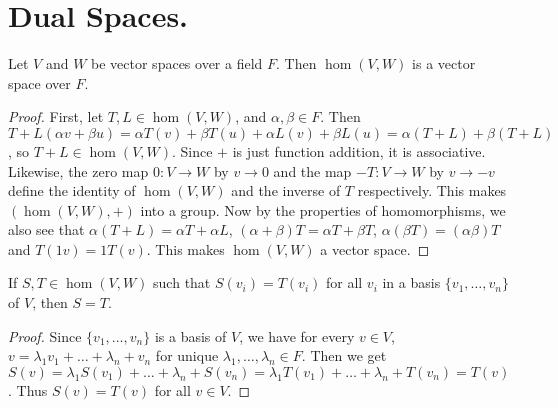 
\section{Dual Spaces.}
\label{section1}

\begin{lemma}\label{1.3.1}
    Let $V$ and  $W$ be vector spaces over a field  $F$. Then  $\hom(V,W)$ is a
    vector space over $F$.
\end{lemma}
\begin{proof}
    First, let $T,L \in \hom(V,W)$, and $\alpha, \beta \in F$. Then  $T+L(\alpha
    v+ \beta u)=\alpha T(v)+\beta T(u)+\alpha L(v)+\beta
    L(u)=\alpha(T+L)+\beta(T+L)$, so $T+L \in \hom(V,W)$. Since $+$ is just
    function addition, it is associative. Likewise, the zero map  $0:V
    \rightarrow W$ by $v \rightarrow 0$ and the map $-T:V \rightarrow W$ by $v
    \rightarrow -v$ define the identity of $\hom(V,W)$ and the inverse of $T$
    respectively. This makes  $(\hom(V,W),+)$ into a group. Now by the
    properties of homomorphisms, we also see that $\alpha(T+L)=\alpha T+\alpha
    L$, $(\alpha+\beta)T=\alpha T+\beta T$, $\alpha(\beta T)=(\alpha\beta)T$ and
    $T(1v)=1T(v)$. This makes $\hom(V,W)$ a vector space.
\end{proof}

\begin{lemma}\label{1.3.2}
    If $S,T \in \hom(V,W)$ such that $S(v_i)=T(v_i)$ for all $v_i$ in a basis
    $\{v_1, \dots, v_n\}$ of $V$, then  $S=T$.
\end{lemma}
\begin{proof}
    Since $\{v_1, \dots, v_n\}$ is a basis of $V$, we have for every  $v \in V$,
     $v=\lambda_1v_1+\dots+\lambda_n+v_n$ for unique $\lambda_1, \dots,
     \lambda_n \in F$. Then we get
     $S(v)=\lambda_1S(v_1)+\dots+\lambda_n+S(v_n)=\lambda_1T(v_1)+\dots+\lambda_n+T(v_n)=T(v)$.
     Thus $S(v)=T(v)$ for all $v \in V$.
\end{proof}

